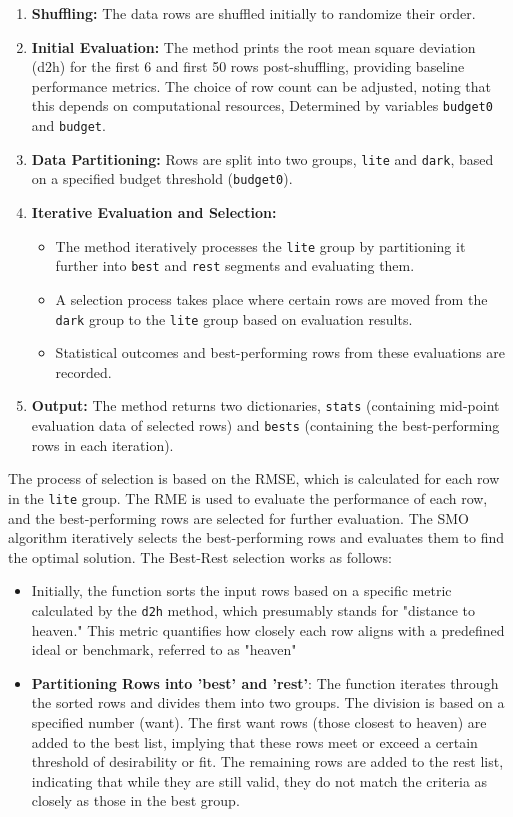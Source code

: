 \documentclass{ieeeaccess}
\begin{document}
\begin{enumerate}
    \item \textbf{Shuffling:} The data rows are shuffled initially to randomize their order.
    \item \textbf{Initial Evaluation:} The method prints the root mean square deviation (d2h) for the first 6 and first 50 rows post-shuffling, providing baseline performance metrics. The choice of row count can be adjusted, noting that this depends on computational resources, Determined by variables \texttt{budget0} and \texttt{budget}.
    \item \textbf{Data Partitioning:} Rows are split into two groups, \texttt{lite} and \texttt{dark}, based on a specified budget threshold (\texttt{budget0}).
    \item \textbf{Iterative Evaluation and Selection:}
        \begin{itemize}
            \item The method iteratively processes the \texttt{lite} group by partitioning it further into \texttt{best} and \texttt{rest} segments and evaluating them.
            \item A selection process takes place where certain rows are moved from the \texttt{dark} group to the \texttt{lite} group based on evaluation results.
            \item Statistical outcomes and best-performing rows from these evaluations are recorded.
        \end{itemize}
    \item \textbf{Output:} The method returns two dictionaries, \texttt{stats} (containing mid-point evaluation data of selected rows) and \texttt{bests} (containing the best-performing rows in each iteration).
\end{enumerate}

The process of selection is based on the RMSE, which is calculated for each row in the \texttt{lite} group. The RME is used to evaluate the performance of each row, and the best-performing rows are selected for further evaluation. The SMO algorithm iteratively selects the best-performing rows and evaluates them to find the optimal solution. The Best-Rest selection works as follows:

\begin{itemize}
    \item Initially, the function sorts the input rows based on a specific metric calculated by the \texttt{d2h} method, which presumably stands for "distance to heaven." This metric quantifies how closely each row aligns with a predefined ideal or benchmark, referred to as "heaven"
    \item \textbf{Partitioning Rows into 'best' and 'rest'}:
    The function iterates through the sorted rows and divides them into two groups. The division is based on a specified number (want).
    The first want rows (those closest to heaven) are added to the best list, implying that these rows meet or exceed a certain threshold of desirability or fit.
    The remaining rows are added to the rest list, indicating that while they are still valid, they do not match the criteria as closely as those in the best group.
\end{itemize}
\end{document}
